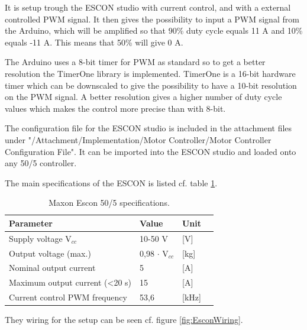 It is setup trough the ESCON studio with current control, and with a external controlled PWM signal. It then gives the possibility to input a PWM signal from the Arduino, which will be amplified so that 90\% duty cycle equals 11 A and 10\% equals -11 A. This means that 50\% will give 0 A.


The Arduino uses a 8-bit timer for PWM as standard so to get a better resolution the TimerOne library is implemented. TimerOne is a 16-bit hardware timer which can be downscaled to give the possibility to have a 10-bit resolution on the PWM signal. A better resolution gives a higher number of duty cycle values which makes the control more precise than with 8-bit. 


The configuration file for the ESCON studio is included in the attachment files under "/Attachment/Implementation/Motor Controller/Motor Controller Configuration File". It can be imported into the ESCON studio and loaded onto any 50/5 controller.

The main specifications of the ESCON is listed cf. table \ref{MaxonSpecifications}.

\begin{table}[htbp]
	\centering
	\begin{tabular}{llll}
	\hline
	Parameter & Value & Unit \\ \hline
	Supply voltage V$_{cc}$& 10-50 V & {[}V{]} \\
	Output voltage (max.) & 0,98 $\cdot$ V$_{cc}$& {[}kg{]} \\
	Nominal output current & 5 & {[}A{]} \\
	Maximum output current (<20 s) & 15 & {[}A{]}\\
	Current control PWM frequency & 53,6 & {[}kHz{]}
	\end{tabular}
\caption{Maxon Escon 50/5 specifications\citep{datasheet:maxon}.}
\label{MaxonSpecifications}
\end{table}

They wiring for the setup can be seen cf. figure \ref{fig:EsconWiring}.  

